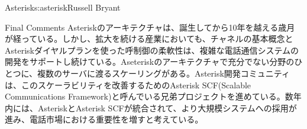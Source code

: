 \begin{aosachapter}{Asterisk}{s:asterisk}{Russell Bryant}
\begin{aosasect1}{Final Comments}
Asteriskのアーキテクチャは、誕生してから10年を越える歳月が経っている。しかし、拡大を続ける産業においても、チャネルの基本概念とAsteriskダイヤルプランを使った呼制御の柔軟性は、複雑な電話通信システムの開発をサポートし続けている。Aseteriskのアーキテクチャで充分でない分野のひとつに、複数のサーバに渡るスケーリングがある。Asterisk開発コミュニティは、このスケーラビリティを改善するためのAsterisk SCF(Scalable Communications Framework)と呼んでいる兄弟プロジェクトを進めている。数年内には、AsteriskとAsterisk SCFが統合されて、より大規模システムへの採用が進み、電話市場における重要性を増すと考えている。

\end{aosasect1}

\end{aosachapter}
